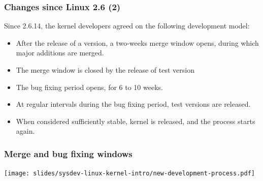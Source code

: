 \begin{frame}
  \frametitle{Changes since Linux 2.6 (2)}
  Since 2.6.14, the kernel developers agreed on the following
  development model:
  \begin{itemize}
  \item After the release of a  version, a two-weeks merge
    window opens, during which major additions are merged.
  \item The merge window is closed by the release of test version
  \item The bug fixing period opens, for 6 to 10 weeks.
  \item At regular intervals during the bug fixing period,
     test versions are released.
  \item When considered sufficiently stable, kernel 
    is released, and the process starts again.
  \end{itemize}
\end{frame}

\begin{frame}
  \frametitle{Merge and bug fixing windows}
  \begin{center}
    \texttt{[image: slides/sysdev-linux-kernel-intro/new-development-process.pdf]}
  \end{center}
\end{frame}

